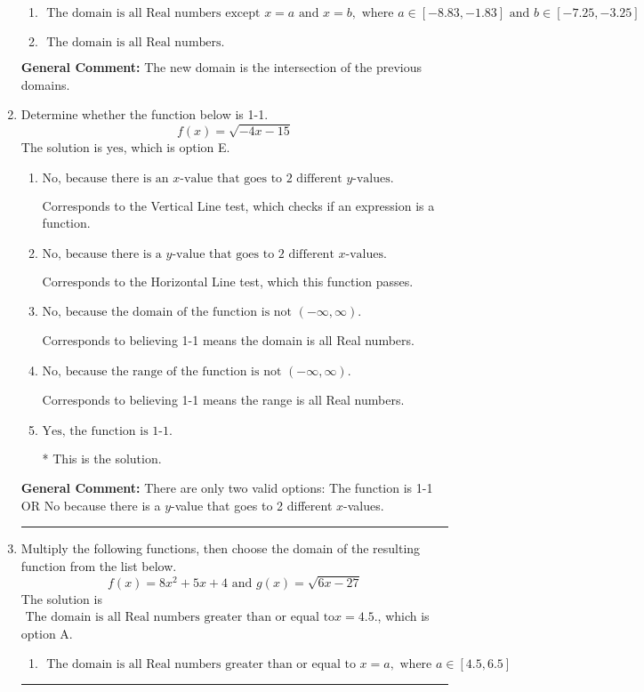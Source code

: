 \documentclass{extbook}[14pt]
\newcommand{\litem}[1]{\item #1

\rule{\textwidth}{0.4pt}}
\begin{document}
\begin{enumerate}
{\begin{enumerate}[label=\Alph*.]
\item \( \text{ The domain is all Real numbers except } x = a \text{ and } x = b, \text{ where } a \in [-8.83, -1.83] \text{ and } b \in [-7.25, -3.25] \)


\item \( \text{ The domain is all Real numbers. } \)


\end{enumerate}

\textbf{General Comment:} The new domain is the intersection of the previous domains.
}
\litem{
Determine whether the function below is 1-1.
\[ f(x) = \sqrt{-4 x - 15} \]The solution is \( \text{yes} \), which is option E.\begin{enumerate}[label=\Alph*.]
\item \( \text{No, because there is an $x$-value that goes to 2 different $y$-values.} \)

Corresponds to the Vertical Line test, which checks if an expression is a function.
\item \( \text{No, because there is a $y$-value that goes to 2 different $x$-values.} \)

Corresponds to the Horizontal Line test, which this function passes.
\item \( \text{No, because the domain of the function is not $(-\infty, \infty)$.} \)

Corresponds to believing 1-1 means the domain is all Real numbers.
\item \( \text{No, because the range of the function is not $(-\infty, \infty)$.} \)

Corresponds to believing 1-1 means the range is all Real numbers.
\item \( \text{Yes, the function is 1-1.} \)

* This is the solution.
\end{enumerate}

\textbf{General Comment:} There are only two valid options: The function is 1-1 OR No because there is a $y$-value that goes to 2 different $x$-values.
}
\litem{
Multiply the following functions, then choose the domain of the resulting function from the list below.
\[ f(x) = 8x^{2} +5 x + 4 \text{ and } g(x) = \sqrt{6x-27}  \]The solution is \( \text{ The domain is all Real numbers greater than or equal to} x = 4.5. \), which is option A.\begin{enumerate}[label=\Alph*.]
\item \( \text{ The domain is all Real numbers greater than or equal to } x = a, \text{ where } a \in [4.5, 6.5] \)



\end{enumerate}}
\end{enumerate}
\end{document}
